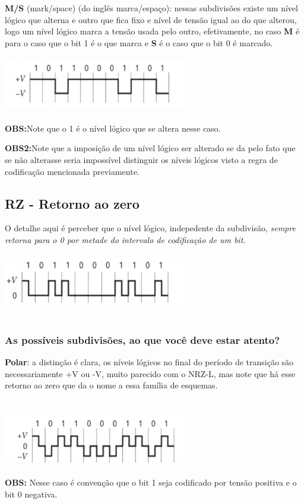 \textbf{M/S} (mark/space) (do inglês marca/espaço): nessas subdivisões existe um nível lógico que alterna e outro que fica fixo e nível de tensão igual ao do que alterou, logo um nível lógico
marca a tensão usada pelo outro, efetivamente, no caso \textbf{M} é para o caso que o bit 1 é o que marca e \textbf{S} é o caso que o bit 0 é marcado.
\\\\
\includegraphics[width=0.6\textwidth]{../assets/nrzm.png}\cite{dc}
\\\\
\textbf{OBS:}Note que o 1 é o nível lógico que se altera nesse caso.

\textbf{OBS2:}Note que a imposição de um nível lógico ser alterado se da pelo fato que se não alterasse seria impossível distinguir os níveis lógicos visto a regra de codificação
mencionada previamente.

\subsection{RZ - Retorno ao zero}

O detalhe aqui é perceber que o nível lógico, indepedente da subdivisão, \textit{sempre retorna para o 0 por metade do intervalo de codificação de um bit}.
\\\\
\includegraphics[width=0.6\textwidth]{../assets/rz.png}\cite{dc}
\\\\

\subsubsection{As possíveis subdivisões, ao que você deve estar atento?}

\textbf{Polar}: a distinção é clara, os níveis lógicos no final do período de transição são necessariamente +V ou -V, muito parecido com o NRZ-L, mas note que há esse retorno ao
zero que da o nome a essa família de esquemas.
\\
\\\\
\includegraphics[width=0.6\textwidth]{../assets/polar-rz.png}\cite{dc}
\\\\
\textbf{OBS:} Nesse caso é convenção que o bit 1 seja codificado por tensão positiva e o bit 0 negativa.
\\

